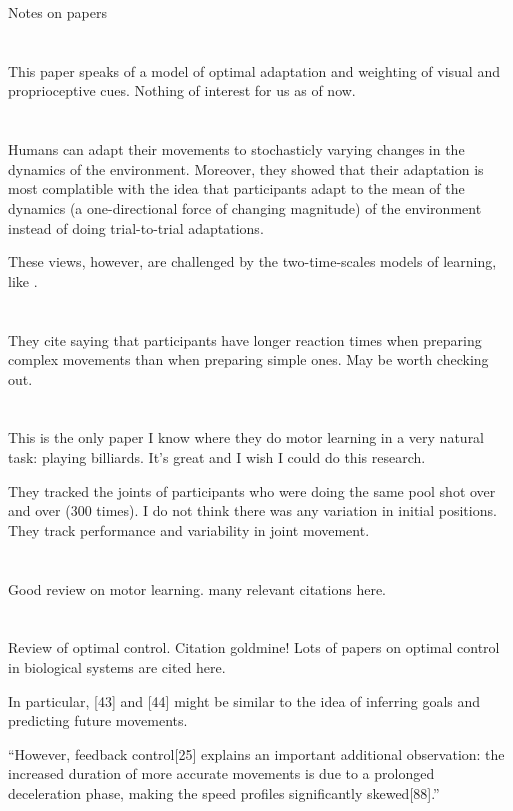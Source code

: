 \documentclass{report}
\begin{document}
\begin{chapter}{Notes on papers}
\section{\cite{Beers_When_2002}}
This paper speaks of a model of optimal adaptation and weighting of visual and proprioceptive cues. Nothing of interest for us as of now.

\section{\cite{Scheidt_Learning_2001}}
Humans can adapt their movements to stochasticly varying changes in the dynamics of the environment. Moreover, they showed that their adaptation is most complatible with the idea that participants adapt to the mean of the dynamics (a one-directional force of changing magnitude) of the environment instead of doing trial-to-trial adaptations.

These views, however, are challenged by the two-time-scales models of learning, like \cite{Smith_Interacting_2006}.

\section{\cite{DeKleijn_Everyday_2014}}
They cite \cite{Henry_Increased_1960} saying that participants have longer reaction times when preparing complex movements than when preparing simple ones. May be worth checking out.

\section{\cite{Haar_Motor_2020}}
This is the only paper I know where they do motor learning in a very natural task: playing billiards. It's great and I wish I could do this research.

They tracked the joints of participants who were doing the same pool shot over and over (300 times). I do not think there was any variation in initial positions. They track performance and variability in joint movement.

\section{\cite{Wolpert_Principles_2011}}
Good review on motor learning. many relevant citations here.

\section{\cite{Todorov_Optimality_2004}}
Review of optimal control. Citation goldmine! Lots of papers on optimal control in biological systems are cited here.

In particular, [43] and [44] might be similar to the idea of inferring goals and predicting future movements.

``However, feedback control[25] explains an important additional observation: the increased duration of more accurate movements is due to a prolonged deceleration phase, making the speed profiles significantly skewed[88].''

\end{chapter}
\end{document}
